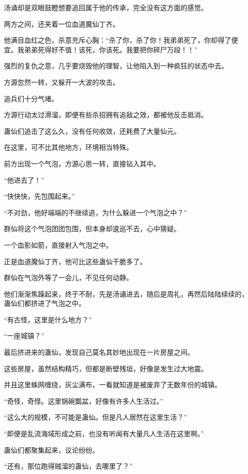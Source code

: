 \begin{this_body}
汤诵却是双眼鼓瞪想要追回属于他的传承，完全没有这方面的感觉。

两方之间，还夹着一位血道魔仙丁齐。

他满目血红之色，杀意充斥心胸：“杀了你，杀了你！我弟弟死了，你却得了便宜。我弟弟死得好不值！该死，你该死。我要把你碎尸万段！！”

强烈的复仇之意，几乎要烧毁他的理智，让他陷入到一种疯狂的状态中去。

方源忽然一转，又躲开一大波的攻击。

追兵们十分气堵。

方源行动太过滑溜，即便有些杀招拥有追敌之效，都被他反击抵消。

蛊仙们追击了这么久，没有任何收效，还耗费了大量仙元。

在这里，可不比其他地方，环境相当特殊。

前方出现一个气泡，方源心思一转，直接钻入其中。

“他进去了！”

“快快快，先包围起来。”

“不对劲，他好端端的不继续逃，为什么躲进一个气泡之中？”

群仙将这个气泡团团包围，但本身却逡巡不去，心中猜疑。

一个血影如箭，直接射入气泡之中。

正是血道魔仙丁齐，他可比这些蛊仙干脆多了。

群仙在气泡外等了一会儿，不见任何动静。

他们渐渐焦躁起来，终于不耐，先是汤诵进去，随后是周礼，再然后陆陆续续的，蛊仙们都挤进了气泡之中。

“有古怪，这里是什么地方？”

“一座城镇？”

最后挤进来的蛊仙，发现自己莫名其妙地出现在一片房屋之间。

这些房屋，虽然结构精巧，但都是断壁残垣，好像是发生过大地震。

并且这里蛛网缠绕，灰尘满布，一看就知道是被废弃了无数年份的城镇。

“奇怪，奇怪。这里锅碗瓢盆，好像有许多人生活过。”

“这么大的规模，不可能是蛊仙。但是凡人居然在这里生活？”

“即便是乱流海域形成之前，也没有听闻有大量凡人生活在这里啊。”

蛊仙们都聚集起来，议论纷纷。

“还有，那位跑得贼溜的蛊仙，去哪里了？”


\end{this_body}

